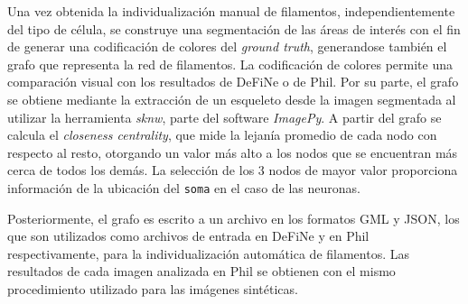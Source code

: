 Una vez obtenida la individualizaci\'on manual de filamentos, independientemente del tipo de c\'elula, se construye una segmentaci\'on de las \'areas de inter\'es con el fin de generar una codificaci\'on de colores del {\it ground truth}, generandose tambi\'en el grafo que representa la red de filamentos. La codificaci\'on de colores permite una comparaci\'on visual con los resultados de DeFiNe o de Phil. Por su parte, el grafo se obtiene mediante la extracci\'on de un esqueleto desde la imagen segmentada al utilizar la herramienta {\it sknw}, parte del software {\it ImagePy}\cite{wang2018imagepy}. A partir del grafo se calcula el {\it closeness centrality}\cite{freeman1978centrality}, que mide la lejan\'ia promedio de cada nodo con respecto al resto, otorgando un valor m\'as alto a los nodos que se encuentran m\'as cerca de todos los dem\'as. La selecci\'on de los 3 nodos de mayor valor proporciona informaci\'on de la ubicaci\'on del {\tt soma} en el caso de las neuronas.


Posteriormente, el grafo es escrito a un archivo en los formatos GML y JSON, los que son utilizados como archivos de entrada en DeFiNe y en Phil respectivamente, para la individualizaci\'on autom\'atica de filamentos.
Las resultados de cada imagen analizada en Phil se obtienen con el mismo procedimiento utilizado para las im\'agenes sint\'eticas.


